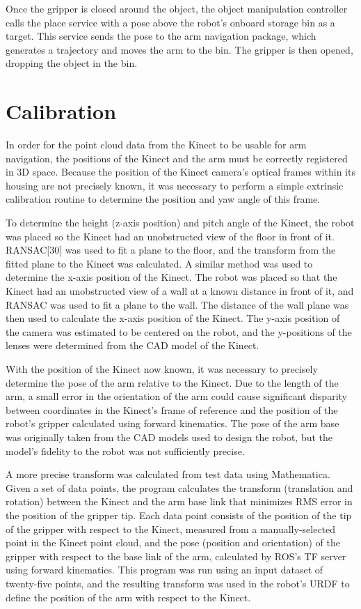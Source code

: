 \documentclass[]{cwru} %
\begin{document}
Once the gripper is closed around the object, the object manipulation
controller calls the place service with a pose above the robot's onboard
storage bin as a target. This service sends the pose to the arm
navigation package, which generates a trajectory and moves the arm to
the bin. The gripper is then opened, dropping the object in the bin.

\section{Calibration}

In order for the point cloud data from the Kinect to be usable for arm
navigation, the positions of the Kinect and the arm must be correctly
registered in 3D space. Because the position of the Kinect camera's
optical frames within its housing are not precisely known, it was
necessary to perform a simple extrinsic calibration routine to determine
the position and yaw angle of this frame.

To determine the height (z-axis position) and pitch angle of the Kinect,
the robot was placed so the Kinect had an unobstructed view of the floor
in front of it. RANSAC{[}30{]} was used to fit a plane to the floor, and
the transform from the fitted plane to the Kinect was calculated. A
similar method was used to determine the x-axis position of the Kinect.
The robot was placed so that the Kinect had an unobstructed view of a
wall at a known distance in front of it, and RANSAC was used to fit a
plane to the wall. The distance of the wall plane was then used to
calculate the x-axis position of the Kinect. The y-axis position of the
camera was estimated to be centered on the robot, and the y-positions of
the lenses were determined from the CAD model of the Kinect.

With the position of the Kinect now known, it was necessary to precisely
determine the pose of the arm relative to the Kinect. Due to the length
of the arm, a small error in the orientation of the arm could cause
significant disparity between coordinates in the Kinect's frame of
reference and the position of the robot's gripper calculated using
forward kinematics. The pose of the arm base was originally taken from
the CAD models used to design the robot, but the model's fidelity to the
robot was not sufficiently precise.

A more precise transform was calculated from test data using
Mathematica. Given a set of data points, the program calculates the
transform (translation and rotation) between the Kinect and the arm base
link that minimizes RMS error in the position of the gripper tip. Each
data point consists of the position of the tip of the gripper with
respect to the Kinect, measured from a manually-selected point in the
Kinect point cloud, and the pose (position and orientation) of the
gripper with respect to the base link of the arm, calculated by ROS's TF
server using forward kinematics. This program was run using an input
dataset of twenty-five points, and the resulting transform was used in
the robot's URDF to define the position of the arm with respect to the
Kinect.
\end{document}
